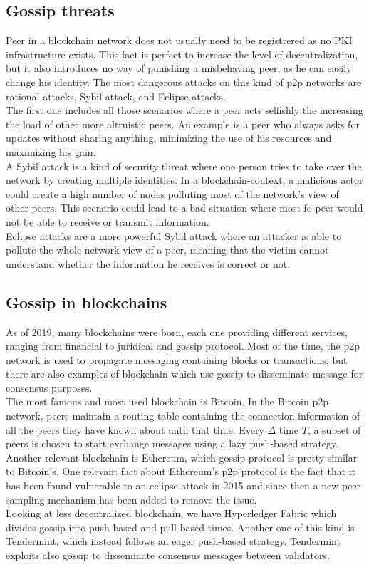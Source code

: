 \documentclass[mscthesis]{usiinfthesis}
\begin{document}
\subsection{Gossip threats}
Peer in a blockchain network does not usually need to be registrered as no PKI infrastructure exists. This fact is perfect to increase the level of decentralization, but it also introduces no way of punishing a misbehaving peer, as he can easily change his identity.
The most dangerous attacks on this kind of p2p networks are rational attacks, Sybil attack, and Eclipse attacks. \\
The first one includes all those scenarios where a peer acts selfishly the increasing the load of other more altruistic peers. An example is a peer who always asks for updates without sharing anything, minimizing the use of his resources and maximizing his gain. \\
A Sybil attack is a kind of security threat where one person tries to take over the network by creating multiple identities. In a blockchain-context, a malicious actor could create a high number of nodes polluting most of the network's view of other peers. This scenario could lead to a bad situation where most fo peer would not be able to receive or transmit information. \\
Eclipse attacks are a more powerful Sybil attack where an attacker is able to pollute the whole network view of a peer, meaning that the victim cannot understand whether the information he receives is correct or not.
\subsection{Gossip in blockchains}
As of 2019, many blockchains were born, each one providing different services, ranging from financial to juridical and gossip protocol. Most of the time, the p2p network is used to propagate messaging containing blocks or transactions, but there are also examples of blockchain which use gossip to disseminate message for consensus purposes.\\
The most famous and most used blockchain is Bitcoin. In the Bitcoin p2p network, peers maintain a routing table containing the connection information of all the peers they have known about until that time. Every $\Delta$ time $T$, a subset of peers is chosen to start exchange messages using a lazy push-based strategy. Another relevant blockchain is Ethereum\citep{wood2014ethereum}, which gossip protocol is pretty similar to Bitcoin's. One relevant fact about Ethereum's p2p protocol is the fact that it has been found vulnerable to an eclipse attack in 2015 and since then a new peer sampling mechanism has been added to remove the issue. \\
Looking at less decentralized blockchain, we have Hyperledger Fabric which divides gossip into push-based and pull-based times. Another one of this kind is Tendermint, which instead follows an eager push-based strategy. Tendermint exploits also gossip to disseminate consensus messages between validators.
\end{document}
